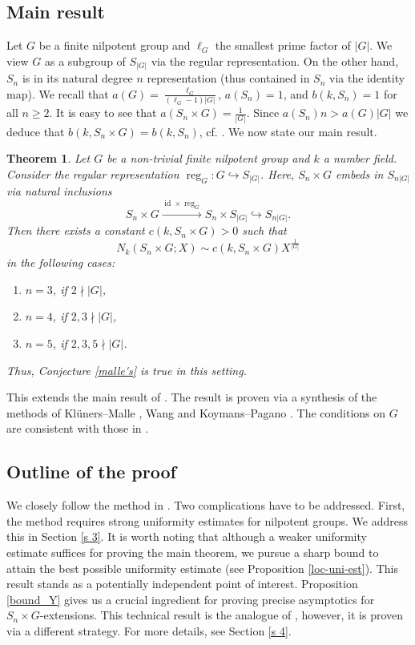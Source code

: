 \documentclass[11pt]{amsart}
\newtheorem{theorem}{Theorem}[section]
\newcommand{\op}[1]{\operatorname{#1}}
\numberwithin{equation}{section}
\begin{document}
\subsection{Main result}
Let $G$ be a finite nilpotent group and $\ell_G$ the smallest prime factor of $|G|$. We view $G$ as a subgroup of $S_{|G|}$ via the regular representation. On the other hand, $S_n$ is in its natural degree $n$ representation (thus contained in $S_n$ via the identity map). We recall that $a(G)= \frac{\ell_G}{(\ell_G-1)|G|}$, $a(S_n)= 1$, and $b(k, S_n)= 1$ for all $n \geq 2$. It is easy to see that $a(S_n\times G)=\frac{1}{|G|}$. Since ${a(S_n)}{n} > {a(G)|G|}$ we deduce that $b(k,S_n\times G)= b(k,S_n)$, cf.  \cite[p.91 l.-3 -- p. 92, l.2]{Wang2020}. We now state our main result. 
\begin{theorem}\label{main theorem}
Let $G$ be a non-trivial finite nilpotent group and $k$ a number field. Consider the regular representation $\op{reg}_G: G\hookrightarrow S_{|G|}$. Here, $S_n\times G$ embeds in $S_{n|G|}$ via natural inclusions 
    \[S_n\times G\xrightarrow{\op{id}\times \op{reg}_G} S_n\times S_{|G|}\hookrightarrow S_{n|G|}. \]Then there exists a constant $c(k,S_n\times G)>0$ such that
\[
N_{k}(S_n\times G; X) \sim c(k,S_n\times G)X^{\frac{1}{|G|}}
\]
in the following cases:
\begin{enumerate}
    \item $n=3$, if $2 \nmid |G|$,
    \item $n=4$, if $2,3 \nmid |G|$,
    \item $n=5$, if $2,3,5 \nmid |G|$.
\end{enumerate}
Thus, Conjecture \ref{malle's} is true in this setting. 
\end{theorem}
This extends the main result of \cite{Wang2020}. The result is proven via a synthesis of the methods of Kl\"uners--Malle \cite{klunersmalle}, Wang \cite{Wang2020} and Koymans--Pagano \cite{koymanspagano2023}. The conditions on $G$ are consistent with those in \cite{Wang2020}.

\subsection{Outline of the proof} We closely follow the method in \cite{Wang2020}. Two complications have to be addressed. First, the method requires strong uniformity estimates for nilpotent groups. We address this in Section \ref{s 3}. It is worth noting that although a weaker uniformity estimate suffices for proving the main theorem, we pursue a sharp bound to attain the best possible uniformity estimate (see Proposition \ref{loc-uni-est}). This result stands as a potentially independent point of interest. Proposition \ref{bound_Y} gives us a crucial ingredient for proving precise asymptotics for $S_n \times G$-extensions. This technical result is the analogue of \cite[p. 117 (5.6)]{Wang2020}, however, it is proven via a different strategy. For more details, see Section \ref{s 4}.
\end{document}
